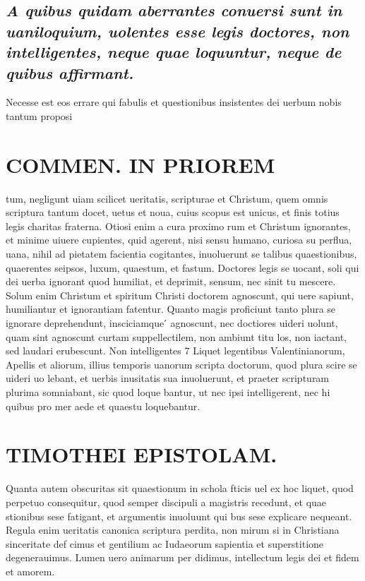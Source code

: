 \documentclass{article}
\begin{document}
\begin{pages}
\subsection*{\textit{A quibus quidam aberrantes conuersi sunt in uaniloquium, uolentes esse legis doctores, non intelligentes, neque quae loquuntur, neque de quibus affirmant. }}\pstart Necesse est eos errare qui fabulis et questionibus insistentes dei uerbum nobis tantum proposi\pend
\section*{COMMEN. IN PRIOREM }
\marginpar{[ p.16 ]}\pstart tum, negligunt uiam scilicet ueritatis, scripturae et Christum, quem omnis scriptura tantum docet, uetus et noua, cuius scopus est unicus, et finis totius legis charitas fraterna. Otiosi enim a cura proximo rum et Christum ignorantes, et minime uiuere cupientes, quid agerent, nisi sensu humano, curiosa su perflua, uana, nihil ad pietatem facientia cogitantes, inuoluerunt se talibus quaestionibus, quaerentes seipsos, luxum, quaestum, et fastum.  \pend\pstart Doctores legis se uocant, soli qui dei uerba ignorant quod humiliat, et deprimit, sensum, nec sinit tu mescere. Solum enim Christum et spiritum Christi doctorem agnoscunt, qui uere sapiunt, humiliantur et ignorantiam fatentur. Quanto magis proficiunt tanto plura se ignorare deprehendunt, insciciamque ́ agnoscunt, nec doctiores uideri uolunt, quam sint agnoscunt curtam suppellectilem, non ambiunt titu los, non iactant, sed laudari erubescunt.  \pend\pstart Non intelligentes 7 Liquet legentibus Valentinianorum, Apellis et aliorum, illius temporis uanorum scripta doctorum, quod plura scire se uideri uo lebant, et uerbis inusitatis sua inuoluerunt, et praeter scripturam plurima somniabant, sic quod loque bantur, ut nec ipsi intelligerent, nec hi quibus pro mer aede et quaestu loquebantur.  \pend
\section*{TIMOTHEI EPISTOLAM. }
\marginpar{[ p.17 ]}\pstart Quanta autem obscuritas sit quaestionum in schola fticis uel ex hoc liquet, quod perpetuo consequitur, quod semper discipuli a magistris recedunt, et quae stionibus sese fatigant, et argumentis inuoluunt qui bus sese explicare nequeant. Regula enim ueritatis canonica scriptura perdita, non mirum si in Christiana sinceritate def cimus et gentilium ac Iudaeorum sapientia et superstitione degenerauimus. Lumen uero animarum per didimus, intellectum legis dei et fidem et amorem.  \pend
{}
{}

\end{pages}
\end{document}
